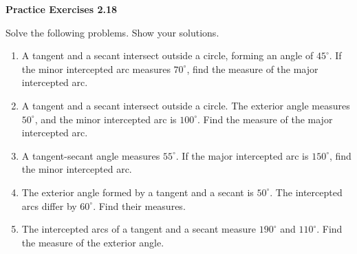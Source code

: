 \vspace{0.3ex}
\noindent\textbf{Practice Exercises 2.18}

\vspace{0.2ex}

Solve the following problems. Show your solutions.

\begin{enumerate}
    \item A tangent and a secant intersect outside a circle, forming an angle of $45^\circ$. If the minor intercepted arc measures $70^\circ$, find the measure of the major intercepted arc.
    \item A tangent and a secant intersect outside a circle. The exterior angle measures $50^\circ$, and the minor intercepted arc is $100^\circ$. Find the measure of the major intercepted arc.
    \item A tangent-secant angle measures $55^\circ$. If the major intercepted arc is $150^\circ$, find the minor intercepted arc.
    \item The exterior angle formed by a tangent and a secant is $50^\circ$. The intercepted arcs differ by $60^\circ$. Find their measures.
    \item The intercepted arcs of a tangent and a secant measure $190^\circ$ and $110^\circ$. Find the measure of the exterior angle.
\end{enumerate}
